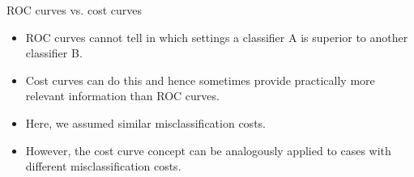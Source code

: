 
\begin{vbframe}{ROC curves vs. cost curves}

\begin{itemize}
  \item ROC curves cannot tell in which settings a classifier A is superior to another classifier B.
  \item Cost curves can do this and hence sometimes provide practically more relevant information than ROC curves.
  \item Here, we assumed similar misclassification costs.
  \item However, the cost curve concept can be analogously applied to cases with different misclassification costs.
  \end{itemize}

\end{vbframe}


%
%
%
%


\endlecture

